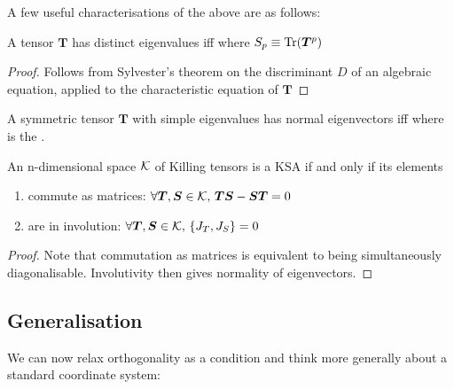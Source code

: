 \documentclass{article}
\begin{document}
A few useful characterisations of the above are as follows:

\begin{prop}
A tensor $\bm{T}$ has distinct eigenvalues iff 
where $S_p \equiv \tr(\bm{T}^p)$
\end{prop}
\begin{proof}
Follows from Sylvester's theorem on the discriminant $D$ of an algebraic equation, applied to the characteristic equation of $\bm{T}$
\end{proof}

\begin{prop}
A symmetric tensor $\bm{T}$ with simple eigenvalues has normal eigenvectors iff 
where 
is the . 
\end{prop}

\begin{prop}
An n-dimensional space $\mc{K}$ of Killing tensors is a KSA if
and only if its elements 
\begin{enumerate}
    \item commute as matrices: $\forall \bm{T},\bm{S} \in \mc{K}, \, \bm{T}\bm{S} - \bm{S}\bm{T}=0$
    \item are in involution: $\forall \bm{T},\bm{S} \in \mc{K}, \, \acomm[J_T]{J_S} = 0$
\end{enumerate}
\end{prop}
\begin{proof}
Note that commutation as matrices is equivalent to being simultaneously diagonalisable. Involutivity then gives normality of eigenvectors. 
\end{proof}

\subsection{Generalisation}

We can now relax orthogonality as a condition and think more generally about a standard coordinate system:
\end{document}
